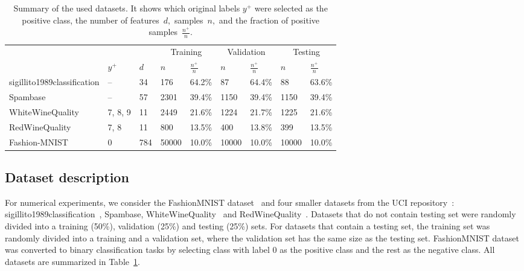 \begin{table}[ht]
  \caption{Summary of the used datasets. It shows which original labels $y^+$ were selected as the positive class, the number of features~$d,$ samples~$n,$ and the fraction of positive samples~$\frac{n^+}{n}$.}
  \label{tab:Datasets}
  \centering
  \begin{tabular}{@{}lllllllll@{}}
      \toprule
      &&& \multicolumn{2}{c}{Training}
        & \multicolumn{2}{c}{Validation}
        & \multicolumn{2}{c}{Testing} \\
      \cmidrule(lr){4-5} \cmidrule(lr){6-7} \cmidrule(l){8-9}
        & $y^+$
        & $d$
        & $n$
        & $\frac{n^+}{n}$
        & $n$
        & $\frac{n^+}{n}$
        & $n$
        & $\frac{n^+}{n}$ \\
      \midrule
      sigillito1989classification
        & -- & 34 & 176 & 64.2\% & 87 & 64.4\% & 88 & 63.6\% \\
      Spambase
        & -- & 57 & 2301 & 39.4\% & 1150 & 39.4\% & 1150 & 39.4\% \\
      WhiteWineQuality
        & 7, 8, 9 & 11 & 2449 & 21.6\% & 1224 & 21.7\% & 1225 & 21.6\% \\
      RedWineQuality
        & 7, 8 & 11 & 800 & 13.5\% & 400 & 13.8\% & 399 & 13.5\% \\
      Fashion-MNIST
        & 0 & 784 & 50000 & 10.0\% & 10000 & 10.0\% & 10000 & 10.0\% \\
      \bottomrule
  \end{tabular}
\end{table}

\subsection{Dataset description}

For numerical experiments, we consider the FashionMNIST dataset~\cite{xiao2017fashionmnist} and four smaller datasets from the UCI repository~\cite{dua2019uci}: sigillito1989classification~\cite{sigillito1989classification}, Spambase, WhiteWineQuality~\cite{cortez2009modeling} and RedWineQuality~\cite{cortez2009modeling}. Datasets that do not contain testing set were randomly divided into a training (50\%), validation (25\%) and testing (25\%) sets. For datasets that contain a testing set, the training set was randomly divided into a training and a validation set, where the validation set has the same size as the testing set. FashionMNIST dataset was converted to binary classification tasks by selecting class with label 0 as the positive class and the rest as the negative class. All datasets are summarized in Table~\ref{tab:Datasets}.

